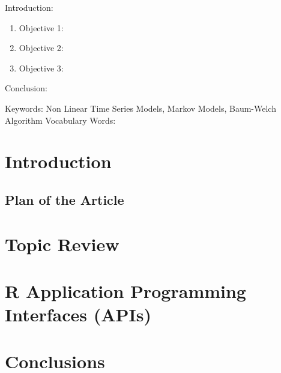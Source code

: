 

\twocolumn
\scriptsize
\begin{frontmatter}
		\title{}
		\author{}
		\address{The Mathematical Learning Space}
\end{frontmatter}	

Introduction:
\begin{enumerate}
\item Objective 1:
\item Objective 2:
\item Objective 3:
\end{enumerate}
Conclusion:

Keywords: Non Linear Time Series Models, Markov Models, Baum-Welch Algorithm
Vocabulary Words:

\section{Introduction}

\subsection{Plan of the Article}


\section{Topic Review}

\section{R Application Programming Interfaces (APIs)}

\section{Conclusions}





\begin{thebibliography}{00}

\end{thebibliography}

